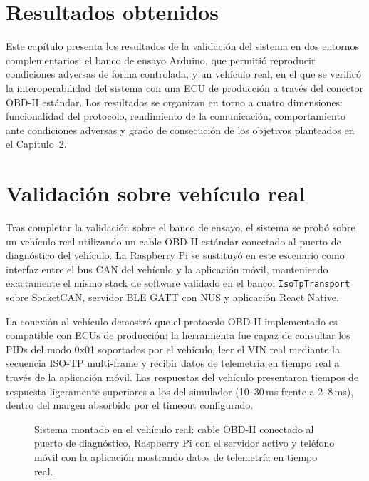 \section{Resultados obtenidos}
\label{sec:resultados}

Este capítulo presenta los resultados de la validación del sistema en dos entornos complementarios: el banco de ensayo Arduino, que permitió reproducir condiciones adversas de forma controlada, y un vehículo real, en el que se verificó la interoperabilidad del sistema con una ECU de producción a través del conector OBD-II estándar. Los resultados se organizan en torno a cuatro dimensiones: funcionalidad del protocolo, rendimiento de la comunicación, comportamiento ante condiciones adversas y grado de consecución de los objetivos planteados en el Capítulo~2.


\section{Validación sobre vehículo real}
\label{sec:resultados_vehiculo_real}

Tras completar la validación sobre el banco de ensayo, el sistema se probó sobre un vehículo real utilizando un cable OBD-II estándar conectado al puerto de diagnóstico del vehículo. La Raspberry Pi se sustituyó en este escenario como interfaz entre el bus CAN del vehículo y la aplicación móvil, manteniendo exactamente el mismo stack de software validado en el banco: \texttt{IsoTpTransport} sobre SocketCAN, servidor BLE GATT con NUS y aplicación React Native.

La conexión al vehículo demostró que el protocolo OBD-II implementado es compatible con ECUs de producción: la herramienta fue capaz de consultar los PIDs del modo 0x01 soportados por el vehículo, leer el VIN real mediante la secuencia ISO-TP multi-frame y recibir datos de telemetría en tiempo real a través de la aplicación móvil. Las respuestas del vehículo presentaron tiempos de respuesta ligeramente superiores a los del simulador (10--30\,ms frente a 2--8\,ms), dentro del margen absorbido por el timeout configurado.

\begin{figure}[!htbp]
\centering
\caption{Sistema montado en el vehículo real: cable OBD-II conectado al puerto de diagnóstico, Raspberry Pi con el servidor activo y teléfono móvil con la aplicación mostrando datos de telemetría en tiempo real.}
\label{fig:vehiculo_real}
\end{figure}


